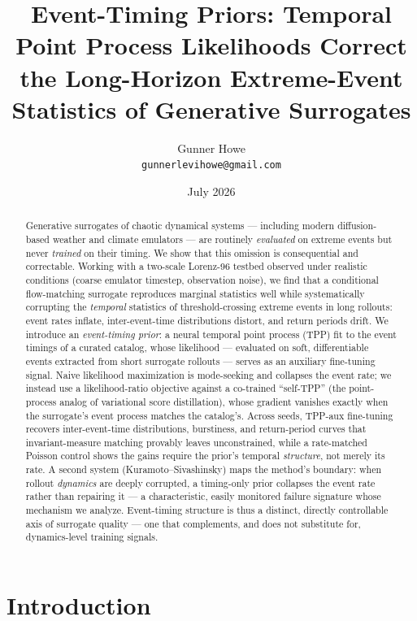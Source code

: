 \documentclass[11pt]{article}
\title{Event-Timing Priors: Temporal Point Process Likelihoods Correct the
Long-Horizon Extreme-Event Statistics of Generative Surrogates}
\author{Gunner Howe\\ \texttt{gunnerlevihowe@gmail.com}}
\date{July 2026}
\begin{document}
\maketitle

\begin{abstract}
Generative surrogates of chaotic dynamical systems --- including modern
diffusion-based weather and climate emulators --- are routinely
\emph{evaluated} on extreme events but never \emph{trained} on their timing.
We show that this omission is consequential and correctable. Working with a
two-scale Lorenz-96 testbed observed under realistic conditions (coarse
emulator timestep, observation noise), we find that a conditional
flow-matching surrogate reproduces marginal statistics well while
systematically corrupting the \emph{temporal} statistics of
threshold-crossing extreme events in long rollouts: event rates inflate,
inter-event-time distributions distort, and return periods drift. We
introduce an \emph{event-timing prior}: a neural temporal point process (TPP)
fit to the event timings of a curated catalog, whose likelihood --- evaluated
on soft, differentiable events extracted from short surrogate rollouts ---
serves as an auxiliary fine-tuning signal. Naive likelihood maximization is
mode-seeking and collapses the event rate; we instead use a likelihood-ratio
objective against a co-trained ``self-TPP'' (the point-process analog of
variational score distillation), whose gradient vanishes exactly when the
surrogate's event process matches the catalog's. Across seeds, TPP-aux
fine-tuning recovers inter-event-time distributions, burstiness, and
return-period curves that invariant-measure matching \citep{jiang2023training}
provably leaves unconstrained, while a rate-matched Poisson control shows the
gains require the prior's temporal \emph{structure}, not merely its rate. A
second system (Kuramoto--Sivashinsky) maps the method's boundary: when
rollout \emph{dynamics} are deeply corrupted, a timing-only prior collapses
the event rate rather than repairing it --- a characteristic, easily
monitored failure signature whose mechanism we analyze. Event-timing
structure is thus a distinct, directly controllable axis of surrogate
quality --- one that complements, and does not substitute for,
dynamics-level training signals.
\end{abstract}

\section{Introduction}
\end{document}
